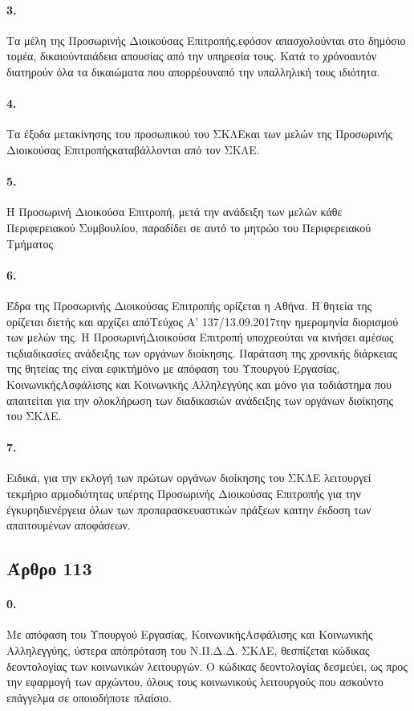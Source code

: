 \documentclass[a4paper,oneside, 10pt]{book}
\begin{document}
\paragraph { 3. } Τα μέλη της Προσωρινής Διοικούσας Επιτροπής,εφόσον απασχολούνται στο δημόσιο τομέα, δικαιούνταιάδεια απουσίας από την υπηρεσία τους. Κατά το χρόνοαυτόν διατηρούν όλα τα δικαιώματα που απορρέουναπό την υπαλληλική τους ιδιότητα.
\paragraph { 4. } Τα έξοδα μετακίνησης του προσωπικού του ΣΚΛΕκαι των μελών της Προσωρινής Διοικούσας Επιτροπήςκαταβάλλονται από τον ΣΚΛΕ.
\paragraph { 5. } Η Προσωρινή Διοικούσα Επιτροπή, μετά την ανάδειξη των μελών κάθε Περιφερειακού Συμβουλίου, παραδίδει σε αυτό το μητρώο του Περιφερειακού Τμήματος
\paragraph { 6. } Έδρα της Προσωρινής Διοικούσας Επιτροπής ορίζεται η Αθήνα. Η θητεία της ορίζεται διετής και αρχίζει απόΤεύχος Α’ 137/13.09.2017την ημερομηνία διορισμού των μελών της. Η ΠροσωρινήΔιοικούσα Επιτροπή υποχρεούται να κινήσει αμέσως τιςδιαδικασίες ανάδειξης των οργάνων διοίκησης. Παράταση της χρονικής διάρκειας της θητείας της είναι εφικτήμόνο με απόφαση του Υπουργού Εργασίας, ΚοινωνικήςΑσφάλισης και Κοινωνικής Αλληλεγγύης και μόνο για τοδιάστημα που απαιτείται για την ολοκλήρωση των διαδικασιών ανάδειξης των οργάνων διοίκησης του ΣΚΛΕ.
\paragraph { 7. } Ειδικά, για την εκλογή των πρώτων οργάνων διοίκησης του ΣΚΛΕ λειτουργεί τεκμήριο αρμοδιότητας υπέρτης Προσωρινής Διοικούσας Επιτροπής για την έγκυρηδιενέργεια όλων των προπαρασκευαστικών πράξεων καιτην έκδοση των απαιτουμένων αποφάσεων.
\subsection*{ Άρθρο 113 }
\paragraph { 0. } Με απόφαση του Υπουργού Εργασίας, ΚοινωνικήςΑσφάλισης και Κοινωνικής Αλληλεγγύης, ύστερα απόπρόταση του Ν.Π.Δ.Δ. ΣΚΛΕ, θεσπίζεται κώδικας δεοντολογίας των κοινωνικών λειτουργών. Ο κώδικας δεοντολογίας δεσμεύει, ως προς την εφαρμογή των αρχώντου, όλους τους κοινωνικούς λειτουργούς που ασκούντο επάγγελμα σε οποιοδήποτε πλαίσιο.
\end{document}

